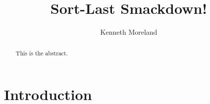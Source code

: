\documentclass[letterpaper,10pt]{article}
\title{Sort-Last Smackdown!}
\author{Kenneth Moreland}
\begin{document}
\maketitle

\begin{abstract}
  This is the abstract.
\end{abstract}

\section{Introduction}
\label{sec:Introduction}
\end{document}
